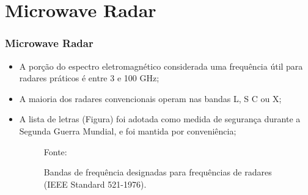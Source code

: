\documentclass[xcolor=dvipsnames, aspectratio=169]{beamer}
\begin{document}
\section[Microwave Radar]{Microwave Radar} 
\begin{frame}
\frametitle{Microwave Radar}
	\begin{itemize}
		\item A porção do espectro eletromagnético considerada uma frequência útil para radares práticos é entre 3 e 100 GHz;
		\item A maioria dos radares convencionais operam nas bandas L, S C ou X;
		\item A lista de letras (Figura) foi adotada como medida de segurança durante a Segunda Guerra Mundial, e foi mantida por conveniência;
		
		\begin{figure}
            \centering
            {Fonte: \cite{everett1995sensors}}
            \caption{Bandas de frequência designadas para frequências de radares (IEEE Standard 521-1976).}
            \label{fig:curva_de_freq}
        \end{figure}


\end{itemize}
\end{frame}
\end{document}

